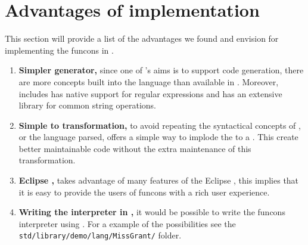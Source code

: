\documentclass[a4paper, oneside, notitlepage]{article}
\newcommand{\CSF}{\textsmaller{CSF}\xspace}
\newcommand{\ASFSDF}{\textsmaller{ASF\hspace{-.05em}\raisebox{.4ex}{\tiny\bf +}SDF}\xspace}
\newcommand{\AST}{\textsmaller{AST}\xspace}
\newcommand{\CST}{\textsmaller{CST}\xspace}
\newcommand{\IDE}{\textsmaller{IDE}\xspace}
\newcommand{\filename}[1]{\texttt{#1}\xspace}
\begin{document}
\section{Advantages of \Rascal implementation}

This section will provide a list of the advantages we found and envision for implementing
the funcons in \Rascal.

\begin{enumerate}
	\newcommand{\advantage}[2]{\item \textbf{#1,} #2}

	\advantage
		{Simpler generator}
		{
			since one of \Rascal's aims is to support code generation, there are
			more concepts built into the language than available in \ASFSDF.
			Moreover, \Rascal includes has native support for regular
			expressions and has an extensive library for common string
			operations.
		}

	\advantage
		{Simple \CST to \AST transformation}
		{
			to avoid repeating the syntactical concepts of \CSF, or the language
			parsed, \Rascal offers a simple way to implode the \CST to a \AST.
			This create better maintainable code without the extra maintenance
			of this transformation.
		}

	\advantage
		{Eclipse \IDE}
		{
			\Rascal takes advantage of many features of the Eclipse \IDE, this
			implies that it is easy to provide the users of funcons with a rich
			user experience.
		}

	\advantage
		{Writing the interpreter in \Rascal}
		{
			it would be possible to write the funcons interpreter using \Rascal.
			For a example of the possibilities see the
			\filename{std/library/demo/lang/MissGrant/} folder.
		}
\end{enumerate}
\end{document}
